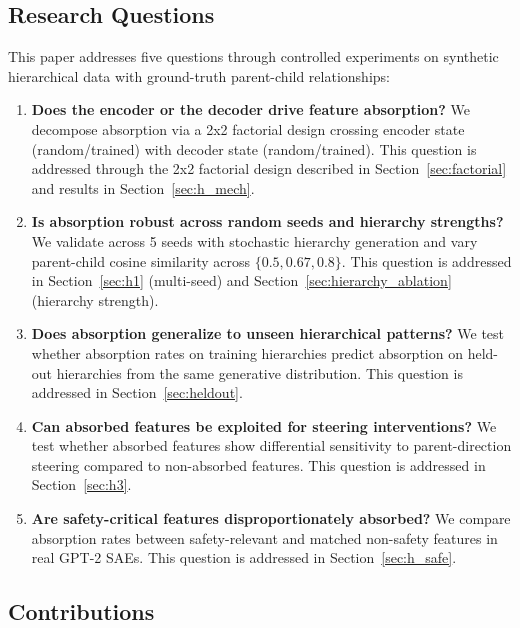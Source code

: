 \documentclass{article}
\begin{document}
\subsection{Research Questions}

This paper addresses five questions through controlled experiments on synthetic hierarchical data with ground-truth parent-child relationships:

\begin{enumerate}
\item \textbf{Does the encoder or the decoder drive feature absorption?} We decompose absorption via a 2x2 factorial design crossing encoder state (random/trained) with decoder state (random/trained). This question is addressed through the 2x2 factorial design described in Section~\ref{sec:factorial} and results in Section~\ref{sec:h_mech}.

\item \textbf{Is absorption robust across random seeds and hierarchy strengths?} We validate across 5 seeds with stochastic hierarchy generation and vary parent-child cosine similarity across $\{0.5, 0.67, 0.8\}$. This question is addressed in Section~\ref{sec:h1} (multi-seed) and Section~\ref{sec:hierarchy_ablation} (hierarchy strength).

\item \textbf{Does absorption generalize to unseen hierarchical patterns?} We test whether absorption rates on training hierarchies predict absorption on held-out hierarchies from the same generative distribution. This question is addressed in Section~\ref{sec:heldout}.

\item \textbf{Can absorbed features be exploited for steering interventions?} We test whether absorbed features show differential sensitivity to parent-direction steering compared to non-absorbed features. This question is addressed in Section~\ref{sec:h3}.

\item \textbf{Are safety-critical features disproportionately absorbed?} We compare absorption rates between safety-relevant and matched non-safety features in real GPT-2 SAEs. This question is addressed in Section~\ref{sec:h_safe}.
\end{enumerate}

\subsection{Contributions}
\end{document}
